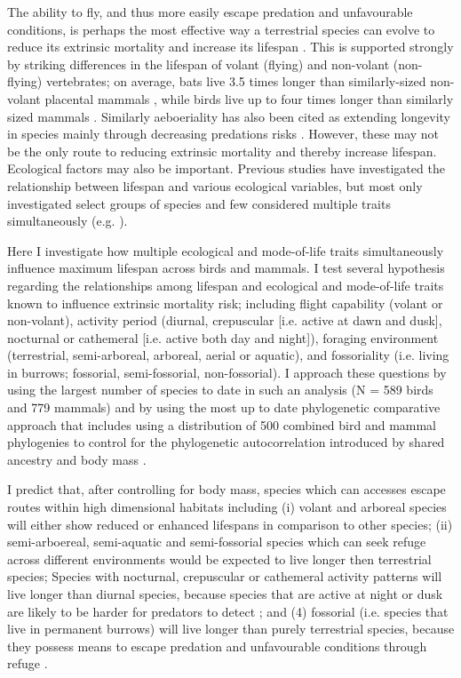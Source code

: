 The ability to fly, and thus more easily escape predation and unfavourable conditions, is perhaps the most effective way a terrestrial species can evolve to reduce its extrinsic mortality and increase its lifespan \citep{partridge1993optimality,holmes1994fly,pomeroy1990fly}. This is supported strongly by striking differences in the lifespan of volant (flying) and non-volant (non-flying) vertebrates; on average, bats live 3.5 times longer than similarly-sized non-volant placental mammals \citep{wilkinson2002life,austad1991mammalian}, while birds live up to four times longer than similarly sized mammals \citep{lindstedt1981body,holmes2003birds}. Similarly aeboeriality has also been cited as extending longevity in species mainly through decreasing predations risks \citep{shattuck2010arboreality}. However, these may not be the only route to reducing extrinsic mortality and thereby increase lifespan. Ecological factors may also be important. Previous studies have investigated the relationship between lifespan and various ecological variables, but most only investigated select groups of species and few considered multiple traits simultaneously (e.g. \cite{shattuck2010arboreality}).

Here I investigate how multiple ecological and mode-of-life traits simultaneously influence maximum lifespan across birds and mammals. I test several hypothesis regarding the relationships among lifespan and ecological and mode-of-life traits known to influence extrinsic mortality risk; including flight capability (volant or non-volant), activity period (diurnal, crepuscular [i.e. active at dawn and dusk], nocturnal or cathemeral [i.e. active both day and night]), foraging environment (terrestrial, semi-arboreal, arboreal, aerial or aquatic), and fossoriality (i.e. living in burrows; fossorial, semi-fossorial, non-fossorial). I approach these questions by using the largest number of species to date in such an analysis (N =  589 birds and 779 mammals) and by using the most up to date phylogenetic comparative approach that includes using a distribution of 500 combined bird and mammal phylogenies to control for the phylogenetic autocorrelation introduced by shared ancestry \citep{harvey1991comparative} and body mass \citep{lindstedt1981body}.


I predict that, after controlling for body mass, species which can accesses escape routes within high dimensional habitats including (i) volant and arboreal species will either show reduced or enhanced lifespans in comparison to other species; (ii) semi-arboereal, semi-aquatic and semi-fossorial species which can seek refuge across different environments would be expected to live longer then terrestrial species; Species with nocturnal, crepuscular or cathemeral activity patterns will live longer than diurnal species, because species that are active at night or dusk are likely to be harder for predators to detect \citep{holmes1994fly,promislow1990living}; and (4) fossorial (i.e. species that live in permanent burrows) will live longer than purely terrestrial species, because they possess means to escape predation and unfavourable conditions through refuge \citep{buffenstein2002naked}.

